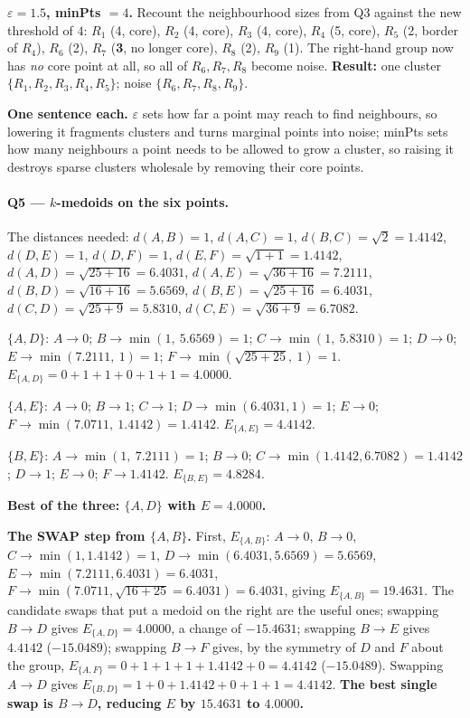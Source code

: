 \documentclass[11pt]{article}
\begin{document}
\textbf{$\varepsilon = 1.5$, minPts $= 4$.} Recount the neighbourhood sizes
from Q3 against the new threshold of $4$: $R_1$ (4, core), $R_2$ (4, core),
$R_3$ (4, core), $R_4$ (5, core), $R_5$ (2, border of $R_4$), $R_6$ (2),
$R_7$ (\textbf{3}, no longer core), $R_8$ (2), $R_9$ (1). The right-hand
group now has \emph{no} core point at all, so all of $R_6, R_7, R_8$ become
noise. \textbf{Result:} one cluster $\{R_1,R_2,R_3,R_4,R_5\}$; noise
$\{R_6,R_7,R_8,R_9\}$.

\textbf{One sentence each.} $\varepsilon$ sets how far a point may reach to
find neighbours, so lowering it fragments clusters and turns marginal points
into noise; minPts sets how many neighbours a point needs to be allowed to
grow a cluster, so raising it destroys sparse clusters wholesale by removing
their core points.

\paragraph{Q5 --- $k$-medoids on the six points.}
The distances needed:
$d(A,B) = 1$, $d(A,C) = 1$, $d(B,C) = \sqrt{2} = 1.4142$,
$d(D,E) = 1$, $d(D,F) = 1$, $d(E,F) = \sqrt{1+1} = 1.4142$,
$d(A,D) = \sqrt{25+16} = 6.4031$, $d(A,E) = \sqrt{36+16} = 7.2111$,
$d(B,D) = \sqrt{16+16} = 5.6569$, $d(B,E) = \sqrt{25+16} = 6.4031$,
$d(C,D) = \sqrt{25+9} = 5.8310$, $d(C,E) = \sqrt{36+9} = 6.7082$.

$\{A,D\}$: $A \to 0$; $B \to \min(1,\ 5.6569) = 1$;
$C \to \min(1,\ 5.8310) = 1$; $D \to 0$; $E \to \min(7.2111,\ 1) = 1$;
$F \to \min(\sqrt{25+25},\ 1) = 1$. \quad
$E_{\{A,D\}} = 0+1+1+0+1+1 = \mathbf{4.0000}$.

$\{A,E\}$: $A \to 0$; $B \to 1$; $C \to 1$; $D \to \min(6.4031, 1) = 1$;
$E \to 0$; $F \to \min(7.0711,\ 1.4142) = 1.4142$. \quad
$E_{\{A,E\}} = \mathbf{4.4142}$.

$\{B,E\}$: $A \to \min(1,\ 7.2111) = 1$; $B \to 0$; $C \to \min(1.4142,
6.7082) = 1.4142$; $D \to 1$; $E \to 0$; $F \to 1.4142$. \quad
$E_{\{B,E\}} = \mathbf{4.8284}$.

\textbf{Best of the three: $\{A,D\}$ with $E = 4.0000$.}

\textbf{The SWAP step from $\{A,B\}$.} First, $E_{\{A,B\}}$: $A \to 0$,
$B \to 0$, $C \to \min(1, 1.4142) = 1$, $D \to \min(6.4031, 5.6569) = 5.6569$,
$E \to \min(7.2111, 6.4031) = 6.4031$,
$F \to \min(7.0711, \sqrt{16+25}=6.4031) = 6.4031$, giving
$E_{\{A,B\}} = 19.4631$. The candidate swaps that put a medoid on the right
are the useful ones; swapping $B \to D$ gives $E_{\{A,D\}} = 4.0000$, a change
of $-15.4631$; swapping $B \to E$ gives $4.4142$ ($-15.0489$); swapping
$B \to F$ gives, by the symmetry of $D$ and $F$ about the group,
$E_{\{A,F\}} = 0+1+1+1+1.4142+0 = 4.4142$ ($-15.0489$). Swapping
$A \to D$ gives $E_{\{B,D\}} = 1+0+1.4142+0+1+1 = 4.4142$. \textbf{The best
single swap is $B \to D$, reducing $E$ by $15.4631$ to $4.0000$.}
\end{document}
